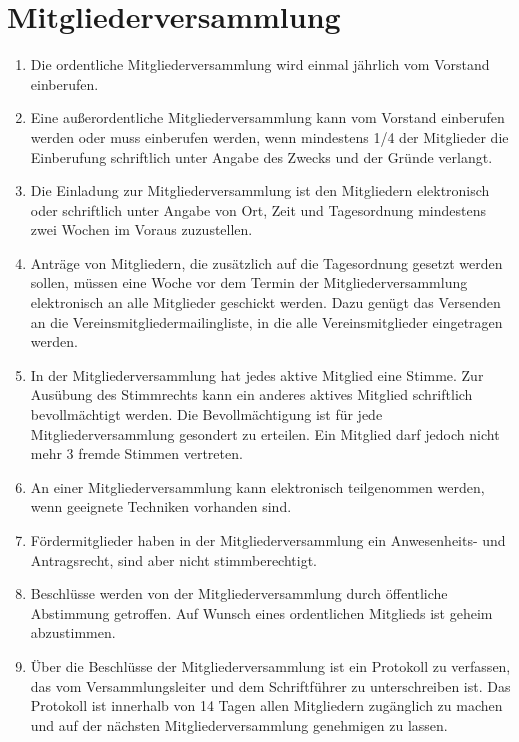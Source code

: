 \documentclass[ngerman]{article}
\begin{document}
\section{Mitgliederversammlung}

\begin{enumerate}
  \item Die ordentliche Mitgliederversammlung wird einmal jährlich vom Vorstand einberufen.
  \item Eine außerordentliche Mitgliederversammlung kann vom Vorstand einberufen werden oder muss  einberufen werden, wenn mindestens 1/4 der Mitglieder die Einberufung schriftlich unter Angabe des Zwecks und der Gründe verlangt.
  \item Die Einladung zur Mitgliederversammlung ist den Mitgliedern elektronisch oder schriftlich unter Angabe von Ort, Zeit und Tagesordnung mindestens zwei Wochen im Voraus zuzustellen.
  \item Anträge von Mitgliedern, die zusätzlich auf die Tagesordnung gesetzt werden sollen, müssen eine Woche vor dem Termin der Mitgliederversammlung elektronisch an alle Mitglieder geschickt werden. Dazu genügt das Versenden an die Vereinsmitgliedermailingliste, in die alle Vereinsmitglieder eingetragen werden.
  \item In der Mitgliederversammlung hat jedes aktive Mitglied eine Stimme. Zur Ausübung des Stimmrechts kann ein anderes aktives Mitglied schriftlich bevollmächtigt werden. Die Bevollmächtigung ist für jede Mitgliederversammlung gesondert zu erteilen. Ein Mitglied darf jedoch nicht mehr 3 fremde Stimmen vertreten.
  \item An einer Mitgliederversammlung kann elektronisch teilgenommen werden, wenn geeignete Techniken vorhanden sind.
  \item Fördermitglieder haben in der Mitgliederversammlung ein Anwesenheits- und Antragsrecht, sind aber nicht stimmberechtigt.
  \item Beschlüsse werden von der Mitgliederversammlung durch öffentliche Abstimmung getroffen.
  Auf Wunsch eines ordentlichen Mitglieds ist geheim abzustimmen.
  \item Über die Beschlüsse der Mitgliederversammlung ist ein Protokoll zu verfassen, das vom Versammlungsleiter und dem Schriftführer zu unterschreiben ist.
  Das Protokoll ist innerhalb von 14 Tagen allen Mitgliedern zugänglich zu machen und auf der nächsten Mitgliederversammlung genehmigen zu lassen.
\end{enumerate}
\end{document}
